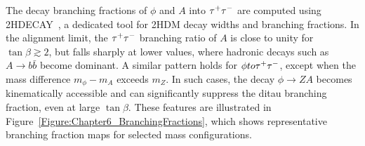 The decay branching fractions of $\phi$ and $A$ into $\tau^+\tau^-$ are computed using \textsc{2HDECAY}~\cite{2HDECAY}, a dedicated tool for 2HDM decay widths and branching fractions. In the alignment limit, the $\tau^+\tau^-$ branching ratio of $A$ is close to unity for $\tan\beta \gtrsim 2$, but falls sharply at lower values, where hadronic decays such as $A \to b\bar{b}$ become dominant. A similar pattern holds for $\phi to \tau^+\tau^-$, except when the mass difference $m_\phi - m_A$ exceeds $m_Z$. In such cases, the decay $\phi \to ZA$ becomes kinematically accessible and can significantly suppress the ditau branching fraction, even at large $\tan\beta$. These features are illustrated in Figure~\ref{Figure:Chapter6_BranchingFractions}, which shows representative branching fraction maps for selected mass configurations. 


